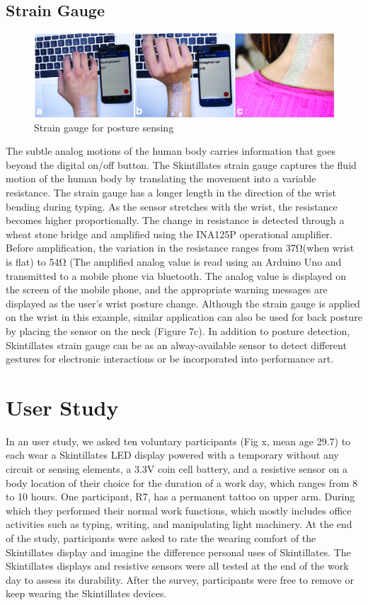 \documentclass{sigchi}
\begin{document}
\subsection {Strain Gauge}
\begin{figure}[!h]
\centering
\includegraphics[width=1.0\textwidth]{figures/Figure9}
\caption{Strain gauge for posture sensing}
\label{fig:figure9}
\end{figure}
The subtle analog motions of the human body carries information that goes beyond the digital on/off button. The Skintillates strain gauge captures the fluid motion of the human body by translating the movement into a variable resistance. The strain gauge has a longer length in the direction of the wrist bending during typing. As the sensor stretches with the wrist, the resistance becomes higher proportionally. The change in resistance is detected through a wheat stone bridge and amplified using the INA125P operational amplifier. Before amplification, the variation in the resistance ranges from 37Ω(when wrist is flat) to 54Ω (The amplified analog value is read using an Arduino Uno and transmitted to a mobile phone via bluetooth. The analog value is displayed on the screen of the mobile phone, and the appropriate warning messages are displayed as the user’s wrist posture change. Although the strain gauge is applied on the wrist in this example, similar application can also be used for back posture by placing the sensor on the neck (Figure 7c). In addition to posture detection, Skintillates strain gauge can be as an alway-available sensor to detect different gestures for electronic interactions or be incorporated into performance art. 

\section {User Study}
In an user study, we asked ten voluntary participants (Fig x, mean age 29.7) to each wear a Skintillates LED display powered with a temporary without any circuit or sensing elements, a 3.3V coin cell battery, and a resistive sensor on a body location of their choice for the duration of a work day, which ranges from 8 to 10 hours. One participant, R7, has a permanent tattoo on upper arm. During which they performed their normal work functions, which mostly includes office activities such as typing, writing, and manipulating light machinery. At the end of the study, participants were asked to rate the wearing comfort of the Skintillates display and imagine the difference personal uses of Skintillates. The Skintillates displays and resistive sensors were all tested at the end of the work day to assess its durability. After the survey, participants were free to remove or keep wearing the Skintillates devices. 
\end{document}
